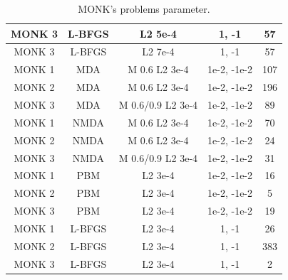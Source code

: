 \begin{table}[H]
\begin{tabular}{|c|c|c|c|c|}
		MONK 3        &    L-BFGS & L2  5e-4 & 1, -1 & 57  \\ \hline
		MONK 3        &    L-BFGS & L2  7e-4 & 1, -1 & 57  \\ \hline
		MONK 1        &    MDA & M  0.6 L2 3e-4 & 1e-2, -1e-2 & 107  \\ \hline
		MONK 2        &    MDA & M  0.6 L2 3e-4 & 1e-2, -1e-2 & 196  \\ \hline
		MONK 3        &    MDA & M  0.6/0.9 L2 3e-4 & 1e-2, -1e-2 & 89  \\ \hline
		MONK 1        &    NMDA & M  0.6 L2 3e-4 & 1e-2, -1e-2 & 70  \\ \hline
		MONK 2        &    NMDA & M  0.6 L2 3e-4 & 1e-2, -1e-2 & 24  \\ \hline
		MONK 3        &    NMDA & M  0.6/0.9 L2 3e-4 & 1e-2, -1e-2 & 31  \\ \hline
		MONK 1        &    PBM & L2 3e-4 & 1e-2, -1e-2 & 16  \\ \hline
		MONK 2        &    PBM & L2 3e-4 & 1e-2, -1e-2 & 5  \\ \hline
		MONK 3        &    PBM & L2 3e-4 & 1e-2, -1e-2 & 19  \\ \hline
		MONK 1        &    L-BFGS & L2 3e-4 & 1, -1 & 26  \\ \hline
		MONK 2        &    L-BFGS & L2 3e-4 & 1, -1 & 383  \\ \hline
		MONK 3        &    L-BFGS & L2 3e-4 & 1, -1 & 2  \\ \hline
	\end{tabular}
	\caption{MONK's problems parameter.}
	\label{tab:dati}
\end{table}
